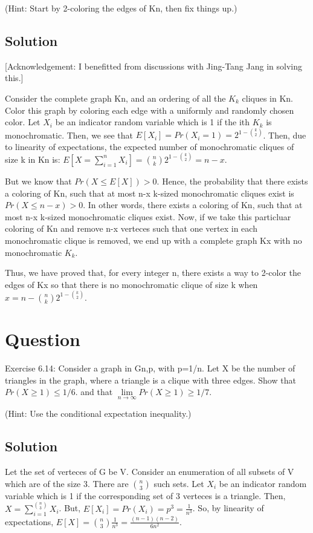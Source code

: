 \documentclass[10pt]{article}
\begin{document}
(Hint: Start by 2-coloring the edges of Kn, then fix things up.)

\subsection{Solution}

[Acknowledgement: I benefitted from discussions with Jing-Tang Jang in solving this.]

Consider the complete graph Kn, and an ordering of all the $K_{k}$ cliques in Kn. Color this graph by coloring each edge with a uniformly and randomly chosen color. Let $X_{i}$ be an indicator random variable which is 1 if the ith $K_{k}$ is monochromatic. Then, we see that $E[X_{i}]=Pr(X_{i}=1)=2^{1-\binom{k}{2}}$. Then, due to linearity of expectations, the expected number of monochromatic cliques of size k in Kn is: $E[X=\sum_{i=1}^{n}X_{i}]=\binom{n}{k}2^{1-\binom{k}{2}} = n-x$.

But we know that $Pr(X \leq E[X])>0$. Hence, the probability that there exists a coloring of Kn, such that at most n-x k-sized monochromatic cliques exist is $Pr(X \leq n-x)>0$. In other words, there exists a coloring of Kn, such that at most n-x k-sized monochromatic cliques exist. Now, if we take this particluar coloring of Kn and remove n-x verteces such that one vertex in each monochromatic clique is removed, we end up with a complete graph Kx with no monochromatic $K_{k}$.

Thus, we have proved that, for every integer n, there exists a way to 2-color the edges of Kx so that there is no monochromatic clique of size k when $x=n-\binom{n}{k}2^{1-\binom{k}{2}}$.

\section{Question}
Exercise 6.14: Consider a graph in Gn,p, with p=1/n. Let X be the number of triangles in the graph, where a triangle is a clique with three edges. Show that
$Pr(X\geq 1)\leq 1/6$.
and that
$\lim \limits_{n \to \infty } Pr(X \geq 1)\geq 1/7$.

(Hint: Use the conditional expectation inequality.)

\subsection{Solution}
Let the set of verteces of G be V. Consider an enumeration of all subsets of V which are of the size 3. There are $\binom{n}{3}$ such sets. Let $X_{i}$ be an indicator random variable which is 1 if the corresponding set of 3 verteces is a triangle. Then, $X=\sum_{i=1}^{\binom{n}{3}} X_{i}$. But, $E[X_{i}]=Pr(X_{i})=p^{3}=\frac{1}{n^{3}}$. So, by linearity of expectations, $E[X]=\binom{n}{3}\frac{1}{n^{3}}=\frac{(n-1)(n-2)}{6n^{2}} $.
\end{document}
